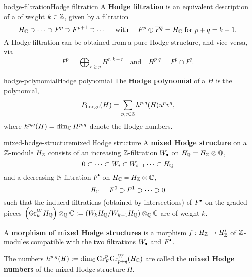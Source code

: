 \begin{topic}{hodge-filtration}{Hodge filtration}
    A \textbf{Hodge filtration} is an equivalent description of a  of weight $k \in \mathbb{Z}$, given by a filtration
    \[ H_{\mathbb{C}} \supset \cdots \supset F^p \supset F^{p + 1} \supset \cdots \quad \text{ with } \quad F^p \oplus \overline{F^q} = H_{\mathbb{C}} \text{ for } p + q = k + 1 . \]
    A Hodge filtration can be obtained from a pure Hodge structure, and vice versa, via
    \[ F^p = \bigoplus_{r \ge p} H^{r, k - r} \quad \text{and} \quad H^{p, q} = F^p \cap \overline{F^q} . \]
\end{topic}

\begin{topic}{hodge-polynomial}{Hodge polynomial}
    The \textbf{Hodge polynomial} of a  $H$ is the polynomial,
    \[ P_\textup{hodge}(H) = \sum_{p, q \in \mathbb{Z}} h^{p, q}(H) u^p v^q , \]
    where $h^{p, q}(H) = \dim_{\mathbb{C}} H^{p, q}$ denote the Hodge numbers.
\end{topic}

\begin{topic}{mixed-hodge-structure}{mixed Hodge structure}
    A \textbf{mixed Hodge structure} on a $\mathbb{Z}$-module $H_{\mathbb{Z}}$ consists of an increasing $\mathbb{Z}$-filtration $W_\bdot$ on $H_{\mathbb{Q}} = H_{\mathbb{Z}} \otimes \mathbb{Q}$,
    \[ 0 \subset \cdots \subset W_i \subset W_{i + 1} \cdots \subset H_{\mathbb{Q}} \]
    and a decreasing $\mathbb{N}$-filtration $F^\bullet$ on $H_{\mathbb{C}} = H_{\mathbb{Z}} \otimes \mathbb{C}$,
    \[ H_{\mathbb{C}} = F^0 \supset F^1 \supset \cdots \supset 0 \]
    such that the induced filtrations (obtained by intersections) of $F^\bdot$ on the graded pieces $\left(\textup{Gr}^W_k H_{\mathbb{Q}}\right) \otimes_{\mathbb{Q}} \mathbb{C} := \left(W_k H_{\mathbb{Q}} / W_{k - 1} H_{\mathbb{Q}}\right) \otimes_{\mathbb{Q}} \mathbb{C}$ are  of weight $k$.
    
    A \textbf{morphism of mixed Hodge structures} is a morphism $f : H_{\mathbb{Z}} \to H'_{\mathbb{Z}}$ of $\mathbb{Z}$-modules compatible with the two filtrations $W_\bdot$ and $F^\bdot$.
    
    The numbers $h^{p, q}(H) := \dim_{\mathbb{C}} \textup{Gr}_F^p \textup{Gr}^W_{p + q}(H_{\mathbb{C}})$ are called the \textbf{mixed Hodge numbers} of the mixed Hodge structure $H$.
\end{topic}
